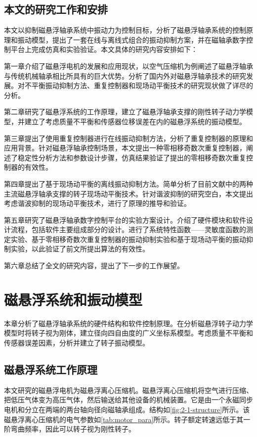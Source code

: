 \documentclass[
  lang=cn,
  degree=master,
  openany,oneside
]{nuaathesis}
\begin{document}
\section{本文的研究工作和安排}
本文以抑制磁悬浮轴承系统中振动力为控制目标，分析了磁悬浮轴承系统的控制原理和振动模型，提出了一套在线与离线式组合的振动抑制方案，并在磁轴承数字控制平台上完成仿真和实验验证。本文具体的研究内容安排如下：

第一章介绍了磁悬浮电机的发展和应用现状，以空气压缩机为例阐述了磁悬浮轴承与传统机械轴承相比所具有的巨大优势。分析了国内外对磁悬浮轴承技术的研究发展。对不平衡振动抑制方法、重复控制器和现场动平衡技术的研究现状做了详尽的分析。

第二章研究了磁悬浮系统的工作原理，建立了磁悬浮轴承支撑的刚性转子动力学模型，并建立了考虑质量不平衡和传感器位移误差在内的磁悬浮系统的振动模型。

第三章提出了使用重复控制器进行在线振动抑制方法，分析了重复控制器的原理和应用背景。针对磁悬浮轴承控制场景，本文提出一种零相移奇数次重复控制器，阐述了稳定性分析方法和参数设计步骤，仿真结果验证了提出的零相移奇数次重复控制器的有效性。

第四章提出了基于现场动平衡的离线振动抑制方法。简单分析了目前文献中的两种主流磁悬浮轴承支撑的转子现场动平衡技术。针对谐波抑制的研究空白，本文提出考虑谐波抑制的现场动平衡技术，进行了原理的推导和验证。

第五章研究了磁悬浮轴承数字控制平台的实验方案设计。介绍了硬件模块和软件设计流程，包括软件主要组成部分的设计。进行了系统特性函数——灵敏度函数的测定实验、基于零相移奇数次重复控制器的振动抑制实验和基于现场动平衡的振动抑制实验，以此验证了前文所提出算法的有效性。

第六章总结了全文的研究内容，提出了下一步的工作展望。

\chapter{磁悬浮系统和振动模型}
本章分析了磁悬浮轴承系统的硬件结构和软件控制原理。在分析磁悬浮转子动力学模型时将转子视为刚体，建立径向四自由度的广义坐标系模型。考虑质量不平衡和传感器误差因素，分析并建立了转子振动模型。

\section{磁悬浮系统工作原理}
本文研究的磁悬浮电机为磁悬浮离心压缩机。磁悬浮离心压缩机将空气进行压缩、把低压气体变为高压气体，然后输送给其他设备的机械装置。它是由一个永磁同步电机和分立在两端的两台轴向径向磁轴承组成。结构如\autoref{fig:2-1-structure}所示。该磁悬浮离心压缩机的电气参数如\autoref{tab:motor_para}所示。转子额定转速远低于其一阶弯曲频率，因此可以转子视为刚性转子。
\end{document}
